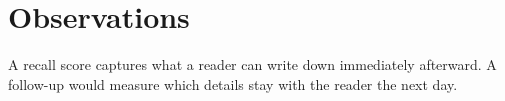 \section{Observations}
A recall score captures what a reader can write down
immediately afterward. A follow-up would measure
which details stay with the reader the next day.
